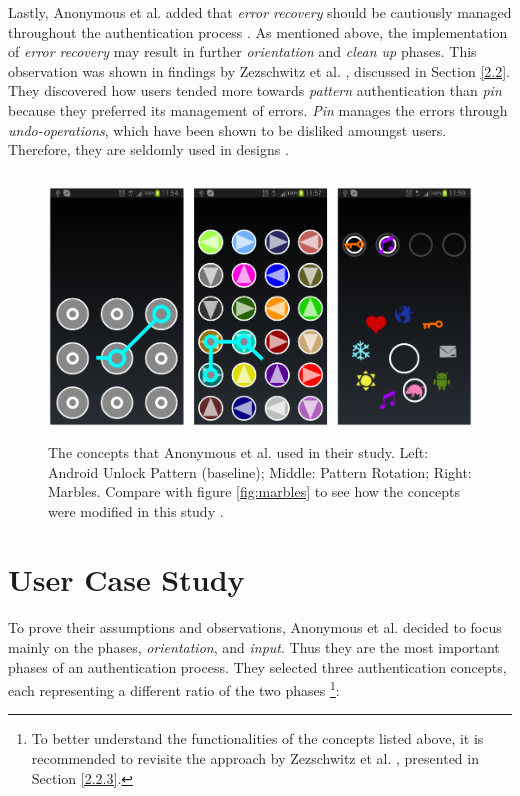 Lastly, Anonymous et al. \cite{anonymous} added that \textit{error recovery} should be cautiously managed throughout the authentication process \cite{anonymous}. As mentioned above, the implementation of \textit{error recovery} may result in further \textit{orientation} and \textit{clean up} phases. This observation was shown in findings by Zezschwitz et al. \cite{PatternWild}, discussed in Section \ref{2.2}. They discovered how users tended more towards \textit{pattern} authentication than \textit{pin} because they preferred its management of errors. \textit{Pin} manages the errors through \textit{undo-operations}, which have been shown to be disliked amoungst users. Therefore, they are seldomly used in designs \cite{PatternWild, anonymous}. 

\begin{figure}[t!]
\centering
\includegraphics[width=14cm, height=7cm]{Chapters/graphics/androidPatternMarble.PNG}
\caption{The concepts that Anonymous et al. \cite{anonymous} used in their study. Left: Android Unlock Pattern (baseline); Middle: Pattern Rotation; Right: Marbles. Compare with figure \ref{fig:marbles} to see how the concepts were modified in this study \cite{anonymous}.}
\label{fig:android}
\end{figure}

\section{User Case Study}

To prove their assumptions and observations, Anonymous et al. \cite{anonymous} decided to focus mainly on the phases, \textit{orientation}, and \textit{input}. Thus they are the most important phases of an authentication process. They selected three authentication concepts, each representing a different ratio of the two phases \cite{anonymous}
\footnote{To better understand the functionalities of the concepts listed above, it is recommended to revisite the approach by Zezschwitz et al. \cite{Marbles}, presented in Section \ref{2.2.3}.}: 


